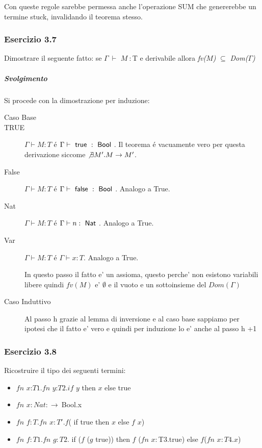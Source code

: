 Con queste regole sarebbe permessa anche l'operazione SUM che genererebbe un termine stuck, invalidando il teorema stesso.

\subsubsection*{Esercizio 3.7}

Dimostrare il seguente fatto: se $\Gamma\:\vdash$ $M\: :  $T e derivabile allora  \textit{fv($M$)}  $\subseteq$ \textit{Dom($\Gamma$)}
\subparagraph*{Svolgimento}

Si procede con la dimostrazione per induzione:

\begin{description}

\item[Caso Base]

\item[TRUE] $\Gamma \vdash{} M : T$ \'e $\Gamma \vdash{} \true{} :
  \Bool$.
  Il teorema \'e vacuamente vero per questa derivazione siccome
  $\not \exists{M'}. M \to{} M'$.
  
 \item[False]
  $\Gamma \vdash{} M : T$ \'e $\Gamma \vdash{} \false{} : \Bool$.
  Analogo a True.

\item[Nat]
  $\Gamma \vdash{} M : T$ \'e $\Gamma \vdash{} n : \Nat$. Analogo a True.

\item[Var] $\Gamma \vdash{} M : T$ \'e $\Gamma \vdash{} x : T$.
  Analogo a True.
  
 In questo passo il fatto e' un assioma, questo perche' non esistono variabili libere quindi $fv(M)$ e' $\emptyset$ e il vuoto e un sottoinsieme del $Dom(\Gamma)$

\item[Caso Induttivo]

Al passo h grazie al lemma di inversione e al caso base sappiamo per ipotesi che il fatto e' vero e quindi per induzione lo e' anche al passo h +1 

\end{description}

\subsubsection*{Esercizio 3.8}
Ricostruire il tipo dei seguenti termini:
\begin{itemize}
\item $fn$ $x$:$T1.fn$ $y$:$T2.if$ $y$ then $x$ else true
\item $fn$ $x:Nat:\rightarrow\:$Bool.x
\item $fn$ $f:T.fn$ $x:T'.f$( if true  then  $x$  else  $f$ $x$)
\item $fn$ $f:T1.fn$ $g:T2.$ if ($f$ ($g$ true)) then $f$ ($fn$ $x:$T3.true) else $f$($fn$ $x:T4.x$)
\end{itemize}


